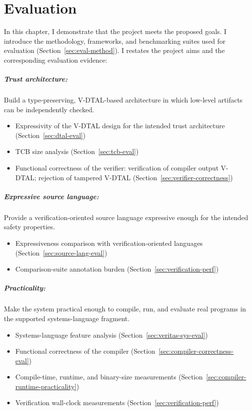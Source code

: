 \chapter{Evaluation}\label{ch:eval}

In this chapter, I demonstrate that the project meets the proposed goals. I introduce the methodology, frameworks, and benchmarking suites used for evaluation (Section~\ref{sec:eval-method}). I restates the project aims and the corresponding evaluation evidence:

\paragraph{Trust architecture:}
Build a type-preserving, V-DTAL-based architecture in which low-level artifacts can be independently checked.
\begin{itemize}
  \item Expressivity of the V-DTAL design for the intended trust architecture (Section~\ref{sec:dtal-eval})
  \item TCB size analysis (Section~\ref{sec:tcb-eval})
  \item Functional correctness of the verifier: verification of compiler output V-DTAL; rejection of tampered V-DTAL (Section~\ref{sec:verifier-correctness})
\end{itemize}

\paragraph{Expressive source language:}
Provide a verification-oriented source language expressive enough for the intended safety properties.
\begin{itemize}
  \item Expressiveness comparison with verification-oriented languages (Section~\ref{sec:source-lang-eval})
  \item Comparison-suite annotation burden (Section~\ref{sec:verification-perf})
\end{itemize}

\paragraph{Practicality:} Make the system practical enough to compile, run, and evaluate real programs in the supported systems-language fragment.
\begin{itemize}
  \item Systems-language feature analysis (Section~\ref{sec:veritas-sys-eval})
  \item Functional correctness of the compiler (Section~\ref{sec:compiler-correctness-eval})
  \item Compile-time, runtime, and binary-size measurements (Section~\ref{sec:compiler-runtime-practicality})
  \item Verification wall-clock measurements (Section~\ref{sec:verification-perf})
\end{itemize}

